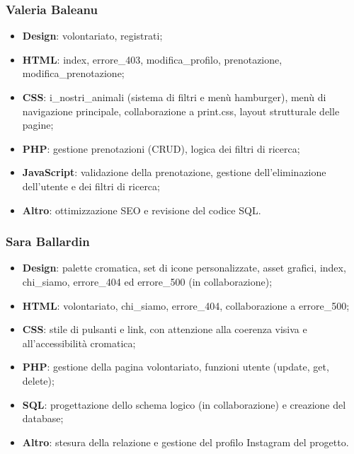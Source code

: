 \documentclass[10pt, letterpaper]{article}
\begin{document}
\subsubsection{Valeria Baleanu}
\begin{itemize}
    \item \textbf{Design}: volontariato, registrati;
    \item \textbf{HTML}: index, errore\_403, modifica\_profilo, prenotazione, modifica\_prenotazione;
    \item \textbf{CSS}: i\_nostri\_animali (sistema di filtri e menù hamburger), menù di navigazione principale, collaborazione a print.css, layout strutturale delle pagine;
    \item \textbf{PHP}: gestione prenotazioni (CRUD), logica dei filtri di ricerca;
    \item \textbf{JavaScript}: validazione della prenotazione, gestione dell’eliminazione dell’utente e dei filtri di ricerca;
    \item \textbf{Altro}: ottimizzazione SEO e revisione del codice SQL.
\end{itemize}

\subsubsection{Sara Ballardin}
\begin{itemize}
    \item \textbf{Design}: palette cromatica, set di icone personalizzate, asset grafici, index, chi\_siamo, errore\_404 ed errore\_500 (in collaborazione);
    \item \textbf{HTML}: volontariato, chi\_siamo, errore\_404, collaborazione a errore\_500;
    \item \textbf{CSS}: stile di pulsanti e link, con attenzione alla coerenza visiva e all’accessibilità cromatica;
    \item \textbf{PHP}: gestione della pagina volontariato, funzioni utente (update, get, delete);
    \item \textbf{SQL}: progettazione dello schema logico (in collaborazione) e creazione del database;
    \item \textbf{Altro}: stesura della relazione e gestione del profilo Instagram del progetto.
\end{itemize}
\end{document}
